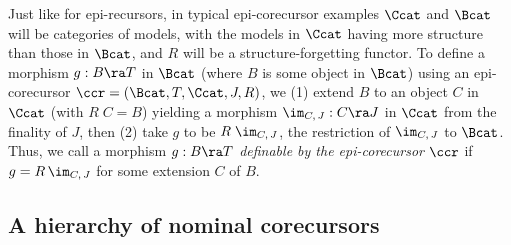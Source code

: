 Just like for epi-recursors, 
in typical epi-corecursor examples $\Ccat$ and $\Bcat$ will be categories of models, %
with the  models in $\Ccat$ having more structure than those in $\Bcat$, and 
$R$ will be a structure-forgetting functor.   
% 
To define a morphism $g: B \ra T$ in $\Bcat$ (where $B$ is some object in $\Bcat$) using an  epi-corecursor $\ccr = (\Bcat,T,\Ccat,J,R)$, we (1) extend $B$ to an object $C$ in $\Ccat$ (with $R\;C = B$) yielding a morphism $\im_{C,\,J} : C \ra J$ in $\Ccat$ from the finality of $J$, 
then (2) take $g$ to be $R\;\im_{C,\,J}$, the restriction of $\im_{C,\,J}$ to $\Bcat$. 
%
Thus, we call a morphism $g: B \ra T$ \emph{definable by the 
		epi-corecursor $\ccr$} if %
	$g = R \,\im_{C,\,J}$ for some extension $C$ of $B$.    
{}





\leftOut{
\begin{figure}
	$$
	\xymatrix@C=4pc@R=1pc{
		\Ccat \ar[d]_R &  C  \ar[r]^{\im_{C,\,J}} &  J
		\\
		\Bcat &  B = R\,C   \ar[r]^{R\,\im_{C,\,J}}  & T = R\,J
	}
	$$
	   \vspace*{-2ex}
	\caption{Epi-corecursor
	}
	\label{fig-epiCRP}
	\vspace*{-2ex}
\end{figure}
}





\vspace*{-0.5ex}\subsection{A hierarchy of nominal corecursors}
\label{subsec-hiarNomCorec}



